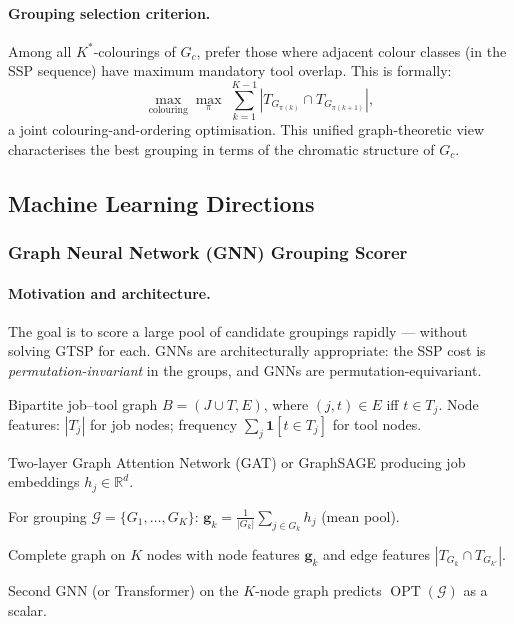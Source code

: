 \documentclass[11pt,a4paper]{article}
\theoremstyle{plain}
\theoremstyle{definition}
\DeclareMathOperator{\OPT}{OPT}
\newcommand{\calG}{\mathcal{G}}     %
\newcommand{\Kstar}{K^{*}}          %
\begin{document}
\paragraph{Grouping selection criterion.}
Among all $\Kstar$-colourings of $G_c$, prefer those where adjacent colour classes (in
the SSP sequence) have maximum mandatory tool overlap. This is formally:
\[
  \max_{\text{colouring}} \max_{\pi}\;
  \sum_{k=1}^{K-1} |T_{G_{\pi(k)}} \cap T_{G_{\pi(k+1)}}|,
\]
a joint colouring-and-ordering optimisation. This unified graph-theoretic view
characterises the best grouping in terms of the chromatic structure of $G_c$.

\subsection{Machine Learning Directions}

\subsubsection{Graph Neural Network (GNN) Grouping Scorer}
\label{sec:GNN}

\paragraph{Motivation and architecture.}
The goal is to score a large pool of candidate groupings rapidly --- without solving
GTSP for each. GNNs are architecturally appropriate: the SSP cost is
\emph{permutation-invariant} in the groups, and GNNs are permutation-equivariant.

\begin{description}[leftmargin=*]
  \item[Input graph.] Bipartite job--tool graph $B = (J \cup T, E)$, where
    $(j,t) \in E$ iff $t \in T_j$. Node features: $|T_j|$ for job nodes;
    frequency $\sum_j \mathbf{1}[t \in T_j]$ for tool nodes.

  \item[Job encoding.] Two-layer Graph Attention Network (GAT) or GraphSAGE
    producing job embeddings $h_j \in \mathbb{R}^d$.

  \item[Group representation.] For grouping $\calG = \{G_1,\ldots,G_K\}$:
    $\mathbf{g}_k = \frac{1}{|G_k|} \sum_{j \in G_k} h_j$ (mean pool).

  \item[Grouping-level graph.] Complete graph on $K$ nodes with node features
    $\mathbf{g}_k$ and edge features $|T_{G_k} \cap T_{G_{k'}}|$.

  \item[Output.] Second GNN (or Transformer) on the $K$-node graph predicts
    $\OPT(\calG)$ as a scalar.
\end{description}
\end{document}
